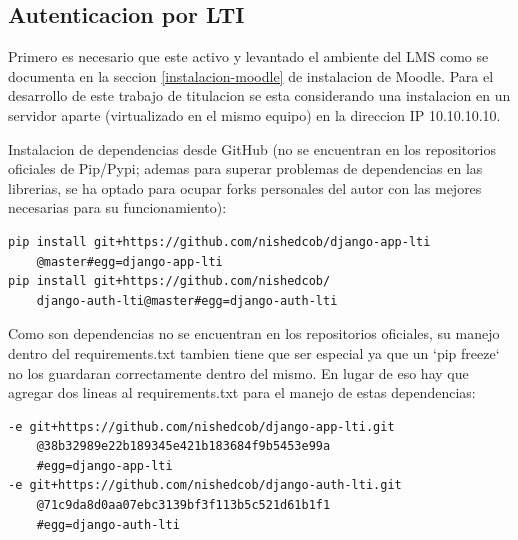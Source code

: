 \subsection{Autenticacion por LTI}

Primero es necesario que este activo y levantado el ambiente del LMS como se documenta en la seccion \ref{instalacion-moodle} de instalacion de Moodle. Para el desarrollo de este trabajo de titulacion se esta considerando una instalacion en un servidor aparte (virtualizado en el mismo equipo) en la direccion IP 10.10.10.10.


Instalacion de dependencias desde GitHub (no se encuentran en los repositorios oficiales de Pip/Pypi; ademas para superar problemas de dependencias en las librerias, se ha optado para ocupar forks personales del autor con las mejores necesarias para su funcionamiento):
\begin{lstlisting}
pip install git+https://github.com/nishedcob/django-app-lti
    @master#egg=django-app-lti
pip install git+https://github.com/nishedcob/
    django-auth-lti@master#egg=django-auth-lti
\end{lstlisting}

Como son dependencias no se encuentran en los repositorios oficiales, su manejo dentro del requirements.txt tambien tiene que ser especial ya que un `pip freeze` no los guardaran correctamente dentro del mismo. En lugar de eso hay que agregar dos lineas al requirements.txt para el manejo de estas dependencias:
\begin{lstlisting}
-e git+https://github.com/nishedcob/django-app-lti.git
    @38b32989e22b189345e421b183684f9b5453e99a
    #egg=django-app-lti
-e git+https://github.com/nishedcob/django-auth-lti.git
    @71c9da8d0aa07ebc3139bf3f113b5c521d61b1f1
    #egg=django-auth-lti
\end{lstlisting}


\lstset{language=Python}

